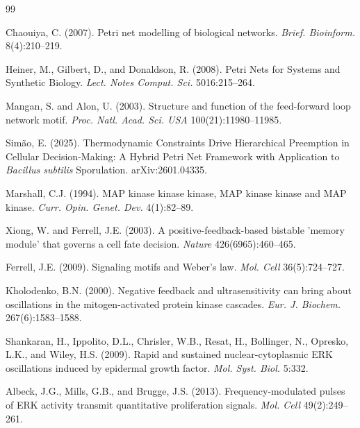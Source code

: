 \documentclass[twocolumn,11pt]{article}
\begin{document}

\begin{thebibliography}{99}
\setlength{\itemsep}{3pt}

Chaouiya, C. (2007).
\newblock Petri net modelling of biological networks.
\newblock \textit{Brief. Bioinform.} 8(4):210--219.

Heiner, M., Gilbert, D., and Donaldson, R. (2008).
\newblock Petri Nets for Systems and Synthetic Biology.
\newblock \textit{Lect. Notes Comput. Sci.} 5016:215--264.

Mangan, S. and Alon, U. (2003).
\newblock Structure and function of the feed-forward loop network motif.
\newblock \textit{Proc. Natl. Acad. Sci. USA} 100(21):11980--11985.

Simão, E. (2025).
\newblock Thermodynamic Constraints Drive Hierarchical Preemption in Cellular Decision-Making: A Hybrid Petri Net Framework with Application to \textit{Bacillus subtilis} Sporulation.
\newblock arXiv:2601.04335.

Marshall, C.J. (1994).
\newblock MAP kinase kinase kinase, MAP kinase kinase and MAP kinase.
\newblock \textit{Curr. Opin. Genet. Dev.} 4(1):82--89.

Xiong, W. and Ferrell, J.E. (2003).
\newblock A positive-feedback-based bistable 'memory module' that governs a cell fate decision.
\newblock \textit{Nature} 426(6965):460--465.

Ferrell, J.E. (2009).
\newblock Signaling motifs and Weber's law.
\newblock \textit{Mol. Cell} 36(5):724--727.

Kholodenko, B.N. (2000).
\newblock Negative feedback and ultrasensitivity can bring about oscillations in the mitogen-activated protein kinase cascades.
\newblock \textit{Eur. J. Biochem.} 267(6):1583--1588.

Shankaran, H., Ippolito, D.L., Chrisler, W.B., Resat, H., Bollinger, N., Opresko, L.K., and Wiley, H.S. (2009).
\newblock Rapid and sustained nuclear-cytoplasmic ERK oscillations induced by epidermal growth factor.
\newblock \textit{Mol. Syst. Biol.} 5:332.

Albeck, J.G., Mills, G.B., and Brugge, J.S. (2013).
\newblock Frequency-modulated pulses of ERK activity transmit quantitative proliferation signals.
\newblock \textit{Mol. Cell} 49(2):249--261.


\end{thebibliography}
\end{document}
